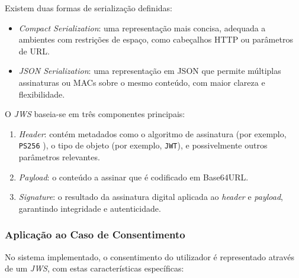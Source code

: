 Existem duas formas de serialização definidas:

\begin{itemize}
  \item \textit{Compact Serialization}: uma representação mais concisa, adequada a ambientes com restrições de espaço, como cabeçalhos HTTP ou parâmetros de URL.
  \item \textit{JSON Serialization}: uma representação em JSON que permite múltiplas assinaturas ou MACs sobre o mesmo conteúdo, com maior clareza e flexibilidade.
\end{itemize}

O \textit{JWS} baseia-se em três componentes principais:

\begin{enumerate}
  \item \textit{Header}: contém metadados como o algoritmo de assinatura (por exemplo, \texttt{PS256} \citep{Auth0SigningAlgorithms}), o tipo de objeto (por exemplo, \texttt{JWT}), e possivelmente outros parâmetros relevantes.
  \item \textit{Payload}: o conteúdo a assinar que é codificado em Base64URL.
  \item \textit{Signature}: o resultado da assinatura digital aplicada ao \textit{header} e \textit{payload}, garantindo integridade e autenticidade.
\end{enumerate}

\subsubsection{Aplicação ao Caso de Consentimento}

No sistema implementado, o consentimento do utilizador é representado através de um \textit{JWS}, com estas características específicas:

